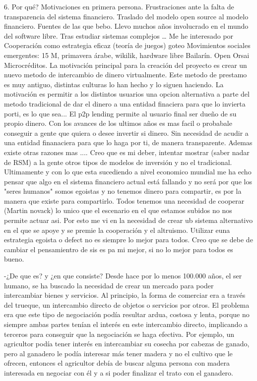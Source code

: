 6. Por qué?
Motivaciones en primera persona.
Frustraciones ante la falta de transparencia del sistema financiero.
Traslado del modelo open source al modelo financiero. 
Fuentes de las que bebo.
Llevo muchos años involucrado en el mundo del software libre.
Tras estudiar sistemas complejos … 
Me he interesado por Cooperación como estrategia eficaz (teoría de juegos)
goteo
Movimientos sociales emergentes: 15 M, primavera  árabe, wikilik, hardware libre
Bailarín.
Open 
Orsai 
Microcréditos.
La motivación principal para la creación del proyecto es crear un nuevo metodo de intercambio de dinero virtualmente. Este metodo de prestamo es muy antiguo, distintas culturas lo han hecho y lo siguen haciendo. La motivación es permitir a los distintos usuarios una opcion alternativa a parte del metodo tradicional de dar el dinero a una entidad finaciera para que lo invierta porti, es lo que sea... El p2p lending permite al usuario final ser dueño de su propio dinero. Con los avances de los ultimos años es mas facil o probabale conseguir a gente que quiera o desee invertir si dinero. Sin necesidad de acudir a una entidad finanaciera para que lo haga por ti, de manera transparente. Ademas existe otras razones mas .... Creo que es mi deber, intentar mostrar (saber nadar de RSM) a la gente otros tipos de modelos de inversión y no el tradicional. Ultimamente y con lo que esta sucediendo a nivel economico mundial me ha echo pensar que algo en el sistema financiero actual está fallando y no será por que los "seres humanos" somos egoistas y no tenemos dinero para compartir, es por la manera que existe para compartirlo. Todos tenemos una necesidad de cooperar (Martin novack) lo unico que el escenario en el que estamos subidos no nos permite actuar asi. Por esto me vi en la necesidad de crear ub sistema alternativo en el que se apoye y se premie la cooperación y el altruismo. Utilizar euna estrategia egoista o defect no es siempre lo mejor para todos. Creo que se debe de cambiar el pensamientro de sis es pa mi mejor, si no lo mejor para todos es bueno.



-¿De que es? y ¿en que consiste?
Desde hace por lo menos 100.000 años, el ser humano, se ha buscado la necesidad de crear un mercado para poder intercambiar bienes y servicios. Al principio, la forma de comerciar era a través del trueque, un intercambio directo de objetos o servicios por otros. El problema era que este tipo de negociación podía resultar ardua, costosa y lenta, porque no siempre ambas partes tenían el interés en este intercambio directo, implicando a terceros para conseguir que la negociación se haga efectiva. Por ejemplo, un agricultor podía tener interés en intercambiar su cosecha por cabezas de ganado, pero al ganadero le podía interesar más tener madera y no el cultivo que le ofrecen, entonces el agricultor debía de buscar alguna persona con madera interesada en negociar con él y a si poder finalizar el trato con el ganadero. 

